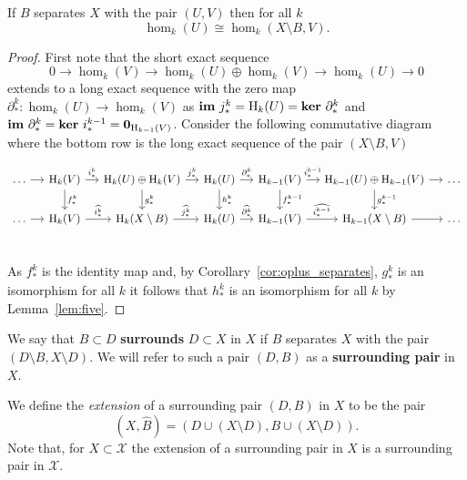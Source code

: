 \begin{lemma}\label{lem:iso_separates}
  If $B$ separates $X$ with the pair $(U, V)$ then for all $k$
  \[ \hom_k(U)\cong \hom_k(X\setminus B, V).\]
\end{lemma}
\begin{proof}
  First note that the short exact sequence
  \[ 0\to \hom_k(V)\to \hom_k(U)\oplus\hom_k(V)\to \hom_k(U)\to 0\]
  extends to a long exact sequence with the zero map $\partial_*^k : \hom_k(U)\to \hom_k(V)$ as $\mathbf{im}~j^k_* = \mathrm{H}_k(U) = \mathbf{ker}~\partial_*^k$ and $\mathbf{im}~\partial_*^k = \mathbf{ker}~ i^{k-1}_* = \mathbf{0}_{\mathrm{H}_{k-1}(V)}$.
  Consider the following commutative diagram where the bottom row is the long exact sequence of the pair $(X\setminus B, V)$
  \begin{small}
  \[\begin{tikzcd}[column sep=small]
    \ldots\ar[r]  & \hom_k(V)\ar[r, "i_*^k"]\ar[d, "f_*^k"]
                  & \hom_k(U)\oplus\hom_k(V)\ar[r, "j_*^k"]\ar[d, "g_*^k"]
                  & \hom_k(U)\ar[r, "\partial_*^k"]\ar[d, "h_*^k"]
                  & \hom_{k-1}(V)\ar[r, "i_*^{k-1}"]\ar[d, "f_*^{k-1}"]
                  & \hom_{k-1}(U)\oplus\hom_{k-1}(V)\ar[r]\ar[d, "g_*^{k-1}"]
                  & \ldots\\
    \ldots\ar[r]  & \hom_k(V)\ar[r, "\widehat{i_*^k}"]
                  & \hom_k(X\setminus B)\ar[r, "\widehat{j_*^k}"]
                  & \hom_k(U)\ar[r, "\widehat{\partial_*^k}"]
                  & \hom_{k-1}(V)\ar[r, "\widehat{i_*^{k-1}}"]
                  & \hom_{k-1}(X\setminus B)\ar[r]
                  & \ldots\\
  \end{tikzcd}\]
  \end{small}
  As $f_*^k$ is the identity map and, by Corollary~\ref{cor:oplus_separates}, $g^k_*$ is an isomorphism for all $k$ it follows that $h_*^k$ is an isomorphism for all $k$ by Lemma~\ref{lem:five}.
\end{proof}

\begin{definition}[Surrounding]
  We say that $B\subset D$ \textbf{surrounds} $D\subset X$ in $X$ if $B$ separates $X$ with the pair $(D\setminus B, X\setminus D)$.
  We will refer to such a pair $(D, B)$ as a \textbf{surrounding pair} in $X$.
\end{definition}

We define the \emph{extension} of a surrounding pair $(D, B)$ in $X$ to be the pair
\[ (X, \hat{B}) = (D\cup (X\setminus D), B\cup (X\setminus D)).\]
Note that, for $X\subset\mathcal{X}$ the extension of a surrounding pair in $X$ is a surrounding pair in $\mathcal{X}$.

